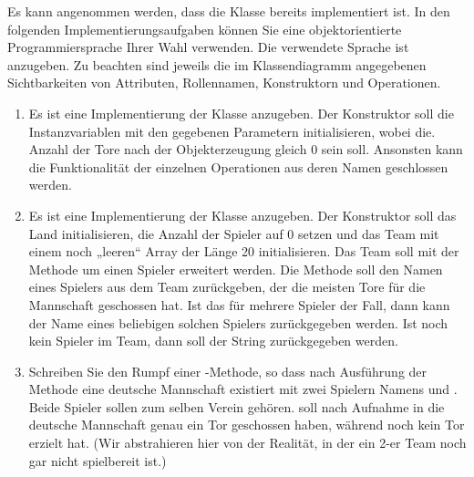\documentclass{lehramt-informatik}
\begin{document}
\noindent
Es kann angenommen werden, dass die Klasse  bereits
implementiert ist. In den folgenden Implementierungsaufgaben können Sie
eine objektorientierte Programmiersprache Ihrer Wahl verwenden. Die
verwendete Sprache ist anzugeben. Zu beachten sind jeweils die im
Klassendiagramm angegebenen Sichtbarkeiten von Attributen, Rollennamen,
Konstruktorn und Operationen.

\begin{enumerate}


\item Es ist eine Implementierung der Klasse  anzugeben.
Der Konstruktor soll die Instanzvariablen mit den gegebenen Parametern
initialisieren, wobei die. Anzahl der Tore nach der Objekterzeugung
gleich 0 sein soll. Ansonsten kann die Funktionalität der einzelnen
Operationen aus deren Namen geschlossen werden.

\begin{antwort}
\end{antwort}


\item Es ist eine Implementierung der Klasse 
anzugeben. Der Konstruktor soll das Land initialisieren, die Anzahl der
Spieler auf 0 setzen und das Team mit einem noch „leeren“ Array der
Länge 20 initialisieren. Das Team soll mit der Methode
 um einen Spieler erweitert werden. Die Methode
 soll den Namen eines Spielers aus dem Team
zurückgeben, der die meisten Tore für die Mannschaft geschossen hat. Ist
das für mehrere Spieler der Fall, dann kann der Name eines beliebigen
solchen Spielers zurückgegeben werden. Ist noch kein Spieler im Team,
dann soll der String  zurückgegeben
werden.

\begin{antwort}
\end{antwort}


\item Schreiben Sie den Rumpf einer -Methode, so dass nach
Ausführung der Methode eine deutsche Mannschaft existiert mit zwei
Spielern Namens  und . Beide
Spieler sollen zum selben Verein  gehören.
 soll nach Aufnahme in die deutsche Mannschaft genau
ein Tor geschossen haben, während  noch kein Tor
erzielt hat. (Wir abstrahieren hier von der Realität, in der ein 2-er
Team noch gar nicht spielbereit ist.)

\begin{antwort}
\end{antwort}
\end{enumerate}
\end{document}

